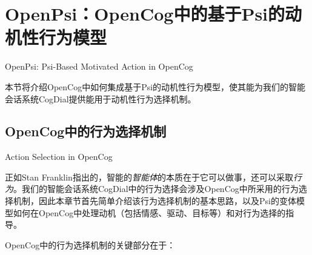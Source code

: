 \section{OpenPsi：OpenCog中的基于Psi的动机性行为模型}{OpenPsi: Psi-Based Motivated Action in OpenCog}

本节将介绍OpenCog中如何集成基于Psi的动机性行为模型，使其能为我们的智能会话系统CogDial提供能用于动机性行为选择机制。

\subsection{OpenCog中的行为选择机制}{ Action Selection in OpenCog}

正如Stan Franklin\cite{Franklin1995}指出的，智能的{\it 智能体}的本质在于它可以做事，还可以采取{\it 行为}。我们的智能会话系统CogDial中的行为选择会涉及OpenCog中所采用的行为选择机制\cite{EGI2}，因此本章节首先简单介绍该行为选择机制的基本思路，以及Psi的变体模型如何在OpenCog中处理动机（包括情感、驱动、目标等）和对行为选择的指导。

OpenCog中的行为选择机制的关键部分在于：

